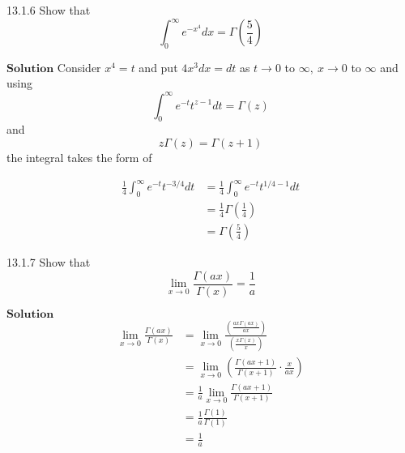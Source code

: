 \newpage

\begin{mybox}{13.1.6}
Show that
$$
\int_{0}^{\infty} e^{-x^{4}} d x=\Gamma\left(\frac{5}{4}\right)
$$
\end{mybox}

$\boxed{\textbf{Solution}}$ Consider $x^{4}=t$ and put $4x^3 dx = dt$ as $t \rightarrow 0$ to $\infty, \  x \rightarrow 0$ to $\infty$ and using
$$
\int_{0}^{\infty} e^{-t} t^{z-1} d t=\Gamma (z)
$$
and
$$
z \Gamma (z)=\Gamma(z+1)
$$
the integral takes the form of

$$\begin{aligned} \frac{1}{4} \int_{0}^{\infty} e^{-t} t^{-3 / 4} d t &=\frac{1}{4} \int_{0}^{\infty} e^{-t} t^{1 / 4-1} d t \\ &=\frac{1}{4} \Gamma\left(\frac{1}{4}\right) \\ &=\Gamma\left(\frac{5}{4}\right) \end{aligned}$$


\begin{mybox}{13.1.7}
Show that
$$
\lim _{x \rightarrow 0} \frac{\Gamma(a x)}{\Gamma(x)}=\frac{1}{a}
$$
\end{mybox}

$\boxed{\textbf{Solution}}$ 
$$\begin{aligned}
\lim _{x \rightarrow 0} \frac{\Gamma(a x)}{\Gamma(x)}&=\lim _{x \rightarrow 0} \frac{\left(\frac{a x \Gamma(a x)}{a x}\right)}{\left(\frac{x \Gamma(x)}{x}\right)} \\
&=\lim _{x \rightarrow 0}\left(\frac{\Gamma(a x+1)}{\Gamma(x+1)} \cdot \frac{x}{a x}\right) \\
&=\frac{1}{a} \lim _{x \rightarrow 0} \frac{\Gamma(a x+1)}{\Gamma(x+1)}\\
&=\frac{1}{a} \frac{\Gamma(1)}{\Gamma(1)}\\
&=\frac{1}{a}
\end{aligned}
$$


\newpage



